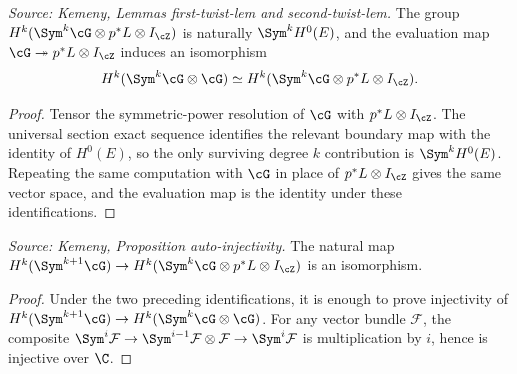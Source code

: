 \begin{lemma}
  \label{lem:kemeny_twisted_symmetric_comparison}
  \textit{Source: Kemeny, Lemmas first-twist-lem and second-twist-lem.}
  The group \(H^k(\Sym^k\cG\otimes p^*L\otimes I_{\cZ})\) is naturally
  \(\Sym^kH^0(E)\), and the evaluation map \(\cG\twoheadrightarrow
  p^*L\otimes I_{\cZ}\) induces an isomorphism
  \[
    H^k(\Sym^k\cG\otimes\cG)\simeq
    H^k(\Sym^k\cG\otimes p^*L\otimes I_{\cZ}).
  \]
\end{lemma}
\begin{proof}
  Tensor the symmetric-power resolution of \(\cG\) with \(p^*L\otimes I_{\cZ}\).
  The universal section exact sequence identifies the relevant boundary map with
  the identity of \(H^0(E)\), so the only surviving degree \(k\) contribution is
  \(\Sym^kH^0(E)\).  Repeating the same computation with \(\cG\) in place of
  \(p^*L\otimes I_{\cZ}\) gives the same vector space, and the evaluation map is
  the identity under these identifications.
\end{proof}

\begin{proposition}
  \label{prop:kemeny_auto_injectivity}
  \textit{Source: Kemeny, Proposition auto-injectivity.}
  The natural map
  \(H^k(\Sym^{k+1}\cG)\to H^k(\Sym^k\cG\otimes p^*L\otimes I_{\cZ})\) is an
  isomorphism.
\end{proposition}
\begin{proof}
  Under the two preceding identifications, it is enough to prove injectivity of
  \(H^k(\Sym^{k+1}\cG)\to H^k(\Sym^k\cG\otimes\cG)\).  For any vector bundle
  \(\mathcal F\), the composite
  \(\Sym^i\mathcal F\to \Sym^{i-1}\mathcal F\otimes\mathcal F\to\Sym^i\mathcal F\)
  is multiplication by \(i\), hence is injective over \(\C\).
\end{proof}

